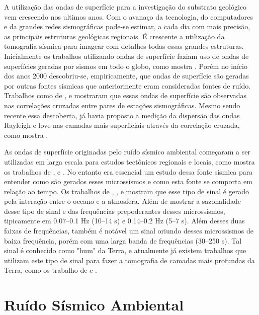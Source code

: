 \documentclass[paper,twocolumn]{geophysics}
\begin{document}
A utilização das ondas de superfície para a investigação do substrato geológico vem crescendo nos ultimos anos. Com o avanaço da tecnologia, do computadores e da grandes redes sismográficas pode-se estimar, a cada dia com mais precisão, as principais estruturas geológicas regionais. É crescente a utilização da tomografia sísmica para imagear com detalhes todas essas grandes estruturas. Inicialmente os trabalhos utilizando ondas de superfície faziam uso de ondas de superfícies geradas por sismos em todo o globo, como mostra \cite{levshin_peculiarities_1992}. Porém no início dos anos 2000 descobriu-se, empiricamente, que ondas de superfície são geradas por outras fontes sísmicas que anteriormente eram consideradas fontes de ruído. Trabalhos como de \cite{campillo_long-range_2003}, \cite{shapiro_emergence_2004} e \cite{wapenaar_retrieving_2004} mostraram que essas ondas de superfície são observadas nas correlações cruzadas entre pares de estações sismográficas. Mesmo sendo recente essa descoberta, \cite{aki_space_1957} já havia proposto a medição da dispersão das ondas Rayleigh e love nas camadas mais superficiais através da correlação cruzada, como mostra \cite{ekstrom_determination_2009}.

As ondas de superfície originadas pelo ruído sísmico ambiental começaram a ser utilizadas em larga escala para estudos tectônicos regionais e locais, como mostra os trabalhos de \cite{bensen_processing_2007}, \cite{lin_surface_2008} e \cite{ekstrom_determination_2009}. No entanto era essencial um estudo dessa fonte sísmica para entender como são gerados esses microssismos e como esta fonte se comporta em relação ao tempo. Os trabalhos de \cite{schulte-pelkum_strong_2004}, \cite{rhie_excitation_2004}, \cite{kedar_oceans_2005} e  \cite{stehly_study_2006} mostram que esse tipo de sinal é gerado pela interação entre o oceano e a atmosfera. Além de mostrar a sazonalidade desse tipo de sinal e das frequências prepoderantes desses microssismos, tipicamente em 0.07–0.1 Hz (10–14 s) e 0.14–0.2 Hz (5–7 s). Além desses duas faixas de frequências, também é notável um sinal oriundo desses microssismos de baixa frequência, porém com uma larga banda de frequências (30–250 s). Tal sinal é conhecido como "hum" da Terra, e atualmente já existem trabalhos que utilizam este tipo de sinal para fazer a tomografia de camadas mais profundas da Terra, como os trabalho de  \cite{nishida_global_2009} e  \cite{haned_global_2016}.

\section*{Ruído Sísmico Ambiental}
\end{document}
